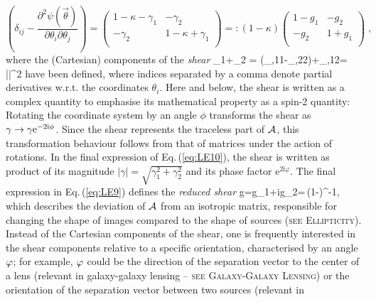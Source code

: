 {\begin{equation}
  \left(\delta_{ij} -
    \frac{\partial^2\psi(\vec\theta)}{\partial\theta_i\partial\theta_j}
  \right) = \left(
    \begin{array}{cc}
      1-\kappa-\gamma_1 & -\gamma_2 \\ 
      -\gamma_2 & 1-\kappa+\gamma_1 \\
    \end{array}
  \right)
=:(1-\kappa)
 \left(
    \begin{array}{cc}
      1-g_1 & -g_2 \\ 
      -g_2 & 1+g_1 \\
    \end{array}
  \right)\;,
\label{eq:LE9}
\end{equation}
%
where the (Cartesian) components of the {\it shear}
%
\be
\gamma\equiv\gamma_1+\gamma_2 =
(\psi_{,11}-\psi_{,22})+\psi_{,12}=
|\gamma|^{2\varphi}
\label{eq:LE10}
\ee
%
have been defined, where indices separated by a comma denote partial
derivatives w.r.t. the coordinates $\theta_i$. Here and below, the
shear is written as a complex quantity to emphasise its mathematical
property as a spin-2 quantity: Rotating the coordinate system by an
angle $\phi$ transforms the shear as
$\gamma\to\gamma{\rm e}^{-2{\rm i}\phi}$. Since the shear represents
the traceless part of ${\cal A}$, this transformation behaviour follows
from that of matrices under the action of rotations. In the final
expression of Eq.\,(\ref{eq:LE10}), the shear is written as product of
its magnitude $|\gamma|=\sqrt{\gamma_1^2+\gamma_2^2}$ and its phase
factor $\mathrm{e}^{2\mathrm{i}\varphi}$. The final expression in
Eq.\,(\ref{eq:LE9}) defines the {\it reduced shear}
%
\be
g=g_1+{\rm i}g_2=\gamma\,(1-\kappa)^{-1}\;,
\label{eq:LE11}
\ee
%
which describes the deviation of ${\cal A}$ from an isotropic matrix,
responsible for changing the shape of images compared to the shape of
sources ({\scshape{\footnotesize see} \gls{Ellipticity}}). Instead of the
Cartesian components of the shear, one is frequently interested in the
shear components relative to a specific orientation, characterised by
an angle $\varphi$; for example, $\varphi$ could be the direction of the
separation vector to the center of a lens (relevant in galaxy-galaxy
lensing -- {\scshape{\footnotesize see} \gls{Galaxy-Galaxy Lensing}}) or the
orientation of the separation vector between two sources (relevant in
}
